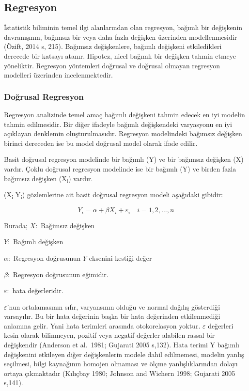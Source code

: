 \documentclass[12pt,twoside]{deuthesis}
\begin{document}
\hypertarget{regresyon}{%
\subsection{Regresyon}\label{regresyon}}

İstatistik biliminin temel ilgi alanlarından olan regresyon, bağımlı bir değişkenin davranışının, bağımsız bir veya daha fazla değişken üzerinden modellenmesidir (Özift, 2014 s, 215). Bağımsız değişkenlere, bağımlı değişkeni etkiledikleri derecede bir katsayı atanır. Hipotez, nicel bağımlı bir değişken tahmin etmeye yöneliktir. Regresyon yöntemleri doğrusal ve doğrusal olmayan regresyon modelleri üzerinden incelenmektedir.

\hypertarget{doux11frusal-regresyon}{%
\subsubsection{Doğrusal Regresyon}\label{doux11frusal-regresyon}}

Regresyon analizinde temel amaç bağımlı değişkeni tahmin edecek en iyi modelin tahmin edilmesidir. Bir diğer ifadeyle bağımlı değişkendeki varyasyonu en iyi açıklayan denklemin oluşturulmasıdır. Regresyon modelindeki bağımsız değişken birinci dereceden ise bu model doğrusal model olarak ifade edilir.

Basit doğrusal regresyon modelinde bir bağımlı (\(\mathrm{Y}\)) ve bir bağımsız değişken (\emph{\(\mathrm{X}\)}) vardır. Çoklu doğrusal regresyon modelinde ise bir bağımlı (\(\mathrm{Y}\)) ve birden fazla bağımsız değişken (\(\mathrm{X_i}\)) vardır.

(X\textsubscript{i} Y\textsubscript{i}) gözlemlerine ait basit doğrusal regresyon modeli aşağıdaki gibidir:

\[
{Y_i}=\alpha+\beta {X_i}+\varepsilon_{i} \quad {i=1,2,\ldots,n}
\]

Burada;
\({X}:\) Bağimsız değişken

\({Y}:\) Bağımlı değişken

\(\alpha:\) Regresyon doğrusunun \({Y}\) eksenini kestiği değer

\(\beta:\) Regresyon doğrusunun eğimidir.

\(\varepsilon:\) hata değerleridir.

\({\varepsilon}\)'nun ortalamasının sıfır, varyansının olduğu ve normal dağılış gösterdiği varsayılır. Bu bir hata değerinin başka bir hata değerinden etkilenmediği anlamına gelir. Yani hata terimleri arasında otokorelasyon yoktur. \(\varepsilon\) değerleri kesin olarak bilinmeyen, pozitif veya negatif değerler alabilen rassal bir değişkendir (Anderson et al.~1981; Gujarati 2005 s,132). Hata terimi Y bağımlı değişkenini etkileyen diğer değişkenlerin modele dahil edilmemesi, modelin yanlış seçilmesi, bilgi kaynağının homojen olmaması ve ölçme yanlışlıklarından dolayı ortaya çıkmaktadır (Kılıçbay 1980; Johnson and Wichern 1998; Gujarati 2005 s,141).
\end{document}
